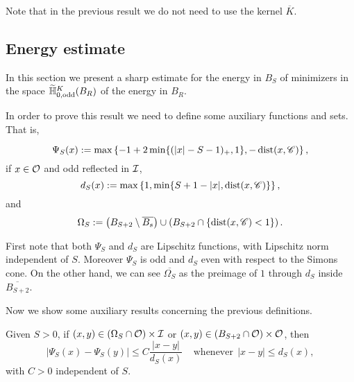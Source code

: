 Note that in the previous result we do not need to use the kernel $\overline{K}$.


\subsection{Energy estimate}

In this section we present a sharp estimate for the energy in $B_S$ of minimizers in the space $\widetilde{\mathbb{H}}^K_{0, \textrm{odd}}(B_R)$ of the energy in $B_R$.

In order to prove this result we need to define some auxiliary functions and sets. That is,

$$ \Psi_S(x) := \max\left\{-1+2\min\{(|x|-S-1)_+,1\},-\operatorname{dist}(x,\mathscr{C}) \right\},  $$
if $x\in \mathcal{O}$ and odd reflected in $\mathcal{I}$,
$$ d_S(x) := \max\left\{1,\min\{S+1-|x|,\operatorname{dist}(x,\mathscr{C})\} \right\},  $$
and
$$ \Omega_S := \left( B_{S+2}\setminus \overline{B_s} \right) \cup \left( B_{S+2} \cap \{\operatorname{dist}(x,\mathscr{C})< 1\}\right). $$

First note that both $\Psi_S$ and $d_S$ are Lipschitz functions, with Lipschitz norm independent of
$S$. Moreover $\Psi_S$ is odd and $d_S$ even with respect to the Simons cone. On the other hand, we
can see $\overline{\Omega_S}$ as the preimage of $1$ through $d_S$ inside $\overline{B_{S+2}}$.

Now we show some auxiliary results concerning the previous definitions.

\begin{lemma}
\label{Lemma: AdaptedLipschitzConditionWith_dFunction}
Given $S>0$, if $(x,y) \in \left(\Omega_S\cap \mathcal{O}\right) \times \mathcal{I}$ or $(x,y)\in \left(B_{S+2}\cap \mathcal{O}\right) \times \mathcal{O}$, then
$$ |\Psi_S(x) - \Psi_S(y)| \leq C \frac{|x-y|}{d_S(x)} \ \ \ \ \ \textrm{whenever} \ \ |x-y|\leq d_S(x), $$
with $C>0$ independent of $S$.
\end{lemma}

